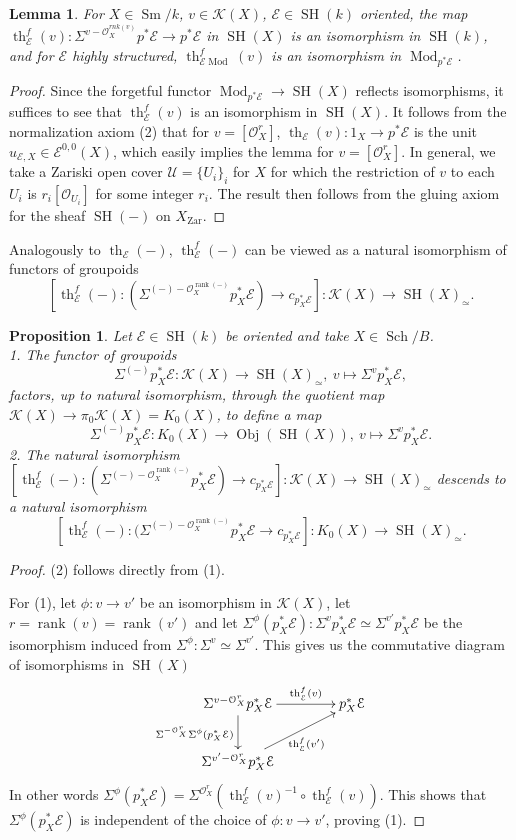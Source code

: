 \documentclass[10pt]{amsart}
\theoremstyle{definition}
\theoremstyle{plain}
\newtheorem{prop}[defn]{Proposition}
\newtheorem{lemma}[defn]{Lemma}
\numberwithin{equation}{section}
\newcommand{\0}{\emptyset}
\newcommand{\sE}{{\mathcal E}}
\newcommand{\sK}{{\mathcal K}}
\newcommand{\sO}{{\mathcal O}}
\newcommand{\sU}{{\mathcal U}}
\newcommand{\SH}{{\operatorname{SH}}}
\newcommand{\Sm}{{\operatorname{Sm}}}
\renewcommand{\th}{{\operatorname{th}}}
\newcommand{\Mod}{{\operatorname{Mod}}}
\newcommand{\rnk}{{\operatorname{rank}}}
\newcommand{\Zar}{{\operatorname{Zar}}}
\newcommand{\Sch}{{\operatorname{Sch}}}
\newcommand{\Obj}{{\operatorname{Obj}}}
\begin{document}
\begin{lemma}\label{lem:ThomIso} For $X\in \Sm/k$, $v\in \sK(X)$, $\sE\in \SH(k)$ oriented, the map $\th_{\sE}^f(v):\Sigma^{v-\sO_X^{rnk(v)}}p^*\sE\to p^*\sE$ in $\SH(X)$ is an isomorphism in $\SH(k)$, and for $\sE$ highly structured, $\th^f_{\sE\Mod}(v)$ is an isomorphism in $\Mod_{p^*\sE}$.
\end{lemma}

\begin{proof} Since the forgetful functor $\Mod_{p^*\sE}\to\SH(X)$ reflects isomorphisms, it suffices to see that $\th_{\sE}^f(v)$ is an isomorphism in $\SH(X)$. It follows from the normalization axiom (2) that for $v=[\sO_X^r]$, $\th_\sE(v):1_X\to p^*\sE$ is the unit $u_{\sE,X}\in \sE^{0,0}(X)$, which easily implies the lemma for $v=[\sO_X^r]$. In general, we take a Zariski open cover $\sU=\{U_i\}_i$ for $X$ for which the restriction of $v$ to each $U_i$ is $r_i[\sO_{U_i}]$ for some integer $r_i$. The result then follows from the gluing axiom for the sheaf $\SH(-)$ on $X_\Zar$.
\end{proof}

Analogously to $\th_\sE(-)$, $\th_{\sE}^f(-)$ can be viewed as a natural isomorphism of functors of groupoids
$$[\th_{\sE}^f(-):(\Sigma^{(-)-\sO_X^{\rnk(-)}}p_X^*\sE)\to c_{p_X^*\sE}]:\sK(X)\to \SH(X)_\simeq.$$

\begin{prop}
\label{prop:K_0ExtensionTh(-)}
Let $\sE\in \SH(k)$ be oriented and take $X\in \Sch/B$. \\[5pt]
1. The functor of groupoids
\[
\Sigma^{(-)}p_X^*\sE:\sK(X)\to \SH(X)_\simeq,\ v\mapsto \Sigma^vp_X^*\sE,
\]
factors, up to natural isomorphism, through the quotient map $\sK(X)\to \pi_0\sK(X)=K_0(X)$, to define a map
\[
\Sigma^{(-)}p_X^*\sE:K_0(X)\to \Obj(\SH(X)),\ v\mapsto \Sigma^vp_X^*\sE.
\]
2. The natural isomorphism $[\th_{\sE}^f(-):(\Sigma^{(-)-\sO_X^{\rnk(-)}}p_X^*\sE)\to c_{p_X^*\sE}]:\sK(X)\to \SH(X)_\simeq$ descends to a natural isomorphism
\[
[\th_{\sE}^f(-):(\Sigma^{(-)-\sO_X^{\rnk(-)}}p_X^*\sE\to c_{p_X^*\sE}]:K_0(X)\to \SH(X)_\simeq. \]
\end{prop}

\begin{proof} (2) follows directly from (1).

For (1), let $\phi:v\to v'$ be an isomorphism in $\sK(X)$,  let $r=\rnk(v)=\rnk(v')$ and let $\Sigma^\phi(p_X^*\sE):\Sigma^{v}p_X^*\sE\simeq \Sigma^{v'}p_X^*\sE$ be the isomorphism induced from $\Sigma^\phi:\Sigma^v \simeq \Sigma^{v'}$. This gives us the commutative diagram of isomorphisms in $\SH(X)$
\[
\xymatrixcolsep{40pt}
\xymatrix{
\Sigma^{v-\sO_X^r}p_X^*\sE\ar[d]_{\Sigma^{-\sO_X^r}\Sigma^\phi(p_X^*\sE)}\ar[r]^-{\th_{\sE}^f(v)}&p_X^*\sE\\
\Sigma^{v'-\sO_X^r}p_X^*\sE\ar[ru]_{\th_{\sE}^f(v')}
}
\]
In other words $\Sigma^{\phi}(p_X^*\sE)=\Sigma^{\sO_X^r}(\th_{\sE}^f(v)^{-1}\circ \th_{\sE}^f(v))$. This shows that $\Sigma^{\phi}(p_X^*\sE)$ is independent of the choice of $\phi:v\to v'$, proving (1). 
\end{proof}
\end{document}
